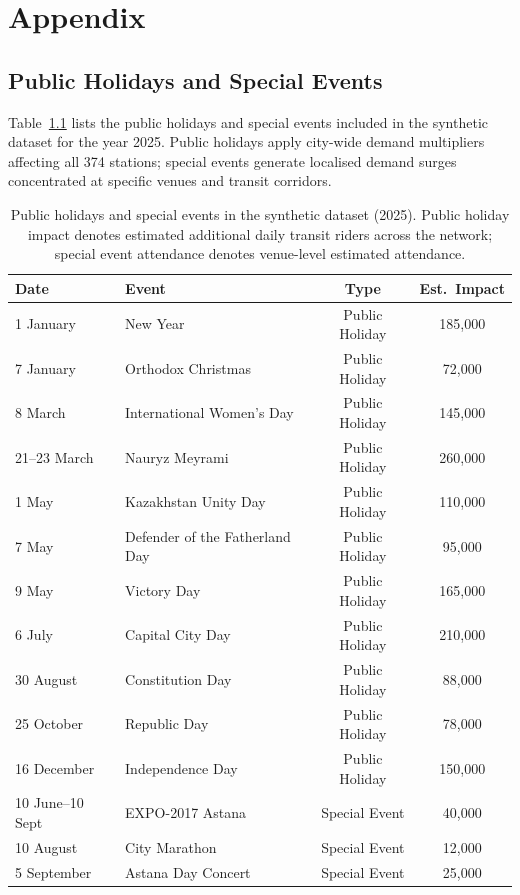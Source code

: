 %
%
\chapter{Appendix}
\label{app:appendix}
\setlength{\parskip}{1em}

\section{Public Holidays and Special Events}
\label{app:holidays}

Table~\ref{Tab.holidays} lists the public holidays and special events included in the synthetic dataset for the year 2025. Public holidays apply city-wide demand multipliers affecting all 374 stations; special events generate localised demand surges concentrated at specific venues and transit corridors.

\begin{table}[H]
\centering
\caption{Public holidays and special events in the synthetic dataset (2025). Public holiday impact denotes estimated additional daily transit riders across the network; special event attendance denotes venue-level estimated attendance.}
\label{Tab.holidays}
\begin{tabular}{llcc}
\toprule
Date & Event & Type & Est.\ Impact \\
\midrule
1 January & New Year & Public Holiday & 185{,}000 \\
7 January & Orthodox Christmas & Public Holiday & 72{,}000 \\
8 March & International Women's Day & Public Holiday & 145{,}000 \\
21--23 March & Nauryz Meyrami & Public Holiday & 260{,}000 \\
1 May & Kazakhstan Unity Day & Public Holiday & 110{,}000 \\
7 May & Defender of the Fatherland Day & Public Holiday & 95{,}000 \\
9 May & Victory Day & Public Holiday & 165{,}000 \\
6 July & Capital City Day & Public Holiday & 210{,}000 \\
30 August & Constitution Day & Public Holiday & 88{,}000 \\
25 October & Republic Day & Public Holiday & 78{,}000 \\
16 December & Independence Day & Public Holiday & 150{,}000 \\
10 June--10 Sept & EXPO-2017 Astana & Special Event & 40{,}000 \\
10 August & City Marathon & Special Event & 12{,}000 \\
5 September & Astana Day Concert & Special Event & 25{,}000 \\
\bottomrule
\end{tabular}
\end{table}

